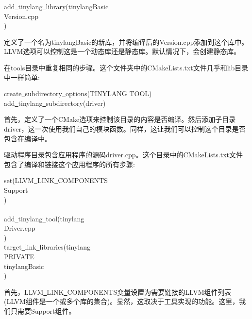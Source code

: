 \begin{tcolorbox}[colback=white,colframe=black]
add\underline{~}tinylang\underline{~}library(tinylangBasic \\
Version.cpp \\
)
\end{tcolorbox}

定义了一个名为tinylangBasic的新库，并将编译后的Version.cpp添加到这个库中。LLVM选项可以控制这是一个动态库还是静态库。默认情况下，会创建静态库。\par

在tools目录中重复相同的步骤。这个文件夹中的CMakeLists.txt文件几乎和lib目录中一样简单:\par

\begin{tcolorbox}[colback=white,colframe=black]
create\underline{~}subdirectory\underline{~}options(TINYLANG TOOL) \\
add\underline{~}tinylang\underline{~}subdirectory(driver)
\end{tcolorbox}

首先，定义了一个CMake选项来控制该目录的内容是否编译。然后添加子目录driver，这一次使用我们自己的模块函数。同样，这让我们可以控制这个目录是否包含在编译中。\par

驱动程序目录包含应用程序的源码driver.cpp。这个目录中的CMakeLists.txt文件包含了编译和链接这个应用程序的所有步骤:\par

\begin{tcolorbox}[colback=white,colframe=black]
set(LLVM\underline{~}LINK\underline{~}COMPONENTS\\
Support\\
)\\
\\
add\underline{~}tinylang\underline{~}tool(tinylang\\
Driver.cpp\\
) \\

target\underline{~}link\underline{~}libraries(tinylang \\
PRIVATE\\
tinylangBasic\\
)
\end{tcolorbox}

首先，LLVM\underline{~}LINK\underline{~}COMPONENTS变量设置为需要链接的LLVM组件列表(LLVM组件是一个或多个库的集合)。显然，这取决于工具实现的功能。这里，我们只需要Support组件。\par

